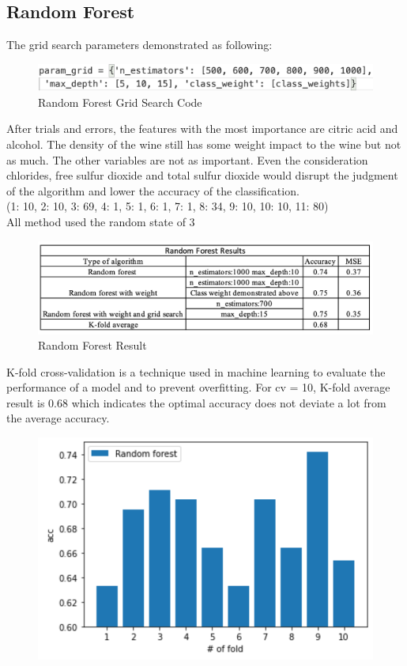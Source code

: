 \documentclass[conference]{IEEEtran}
\begin{document}
{\subsection{Random Forest}
The grid search parameters demonstrated as following:
	\begin{figure}[h]
	\label{fig:foo}
	\begin{center}
	\includegraphics[scale=0.35]{RandomForestGrid.png}
	\caption{Random Forest Grid Search Code}
	\end{center}
	\end{figure}
After trials and errors, the features with the most importance are citric acid and alcohol. The density of the wine still has some weight impact to the wine but not as much. The other variables are not as important. Even the consideration chlorides, free sulfur dioxide and total sulfur dioxide would disrupt the judgment of the algorithm and lower the accuracy of the classification. \\
(1: 10, 2: 10, 3: 69, 4: 1, 5: 1, 6: 1, 7: 1, 8: 34, 9: 10, 10: 10, 11: 80)\\
All method used the random state of 3
	\begin{figure}[h]
	\label{fig:foo}
	\begin{center}
	\includegraphics[scale=0.3]{randomForestResult.png}
	\caption{Random Forest Result}
	\end{center}
	\end{figure}
K-fold cross-validation is a technique used in machine learning to evaluate the performance of a model and to prevent overfitting. For cv = 10, K-fold average result is 0.68 which indicates the optimal accuracy does not deviate a lot from the average accuracy.
	\begin{figure}[h]
	\label{fig:foo}
	\begin{center}
	\includegraphics[scale=0.4]{RandomForestKfold.png}

\end{center}
\end{figure}}
\end{document}

